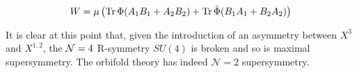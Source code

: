\begin{equation}
	W = \mu \left( \operatorname{Tr} \Phi (A_1 B_1 + A_2 B_2 ) + \operatorname{Tr} \tilde\Phi (B_1 A_1 + B_2 A_2) \right)
	\label{}
\end{equation}

It is clear at this point that, given the introduction of an asymmetry between $X^3$ and $X^{1,2}$, the $\mathcal{N} = 4$ R-symmetry $SU(4)$ is broken and so is maximal supersymmetry. The orbifold theory has indeed $\mathcal{N}=2$ supersymmetry\cite{Douglas}.

%
%
%
%
%
%
%
%
%

